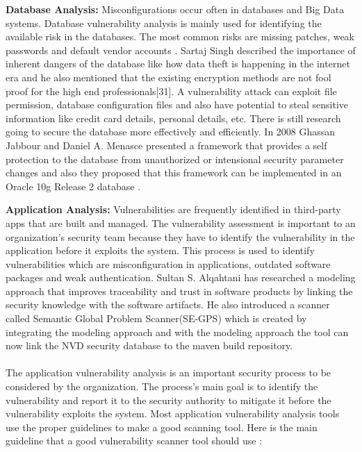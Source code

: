 {\bf Database Analysis:} Misconfigurations occur often in databases and Big Data systems. Database vulnerability analysis is mainly used for identifying the available risk in the databases. The most common risks are missing patches, weak passwords and default vendor accounts \cite{Im2021}. Sartaj Singh described the importance of inherent dangers of the database like how data theft is happening in the internet era and he also mentioned that the existing encryption methods are not fool proof for the high end professionals[31]. A vulnerability attack can exploit file permission, database configuration files and also have potential to steal sensitive information like credit card details, personal details, etc. There is still research going to secure the database more effectively and efficiently. In 2008 Ghassan Jabbour and Daniel A. Menasce presented a framework that provides a self protection to the database from unauthorized or intensional security parameter changes and also they proposed that this framework can be implemented in an Oracle 10g Release 2 database \cite{JaMe2008}.

{\bf Application Analysis:} Vulnerabilities are frequently identified in third-party apps that are built and managed. The vulnerability assessment is important to an organization’s security team because they have to identify the vulnerability in the application before it exploits the system. This process is used to identify vulnerabilities which are misconfiguration in applications, outdated software packages and weak authentication. Sultan S. Alqahtani \cite{Al2017} has researched a modeling approach that improves traceability and trust in software products by linking the security knowledge with the software artifacts. He also introduced a scanner called  Semantic Global Problem Scanner(SE-GPS) which is created by integrating the modeling approach and with the modeling approach the tool can now link the \acs{NVD} \cite{nist} security database to the maven build repository. 
\paragraph{}
The application vulnerability analysis is an important security process to be considered by the organization. The process's main goal is to identify the vulnerability and report it to the security authority to mitigate it before the vulnerability exploits the system. Most application vulnerability analysis tools use the proper guidelines to make a good scanning tool. Here is the main guideline that a good vulnerability scanner tool should use \cite{Syamini}:

